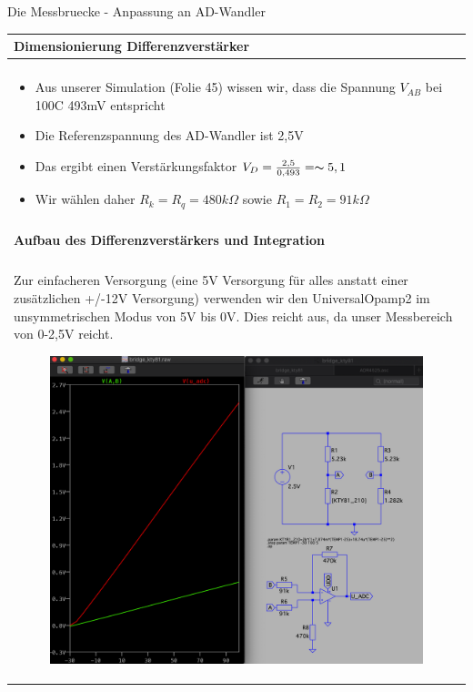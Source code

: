 \begin{frame}[t]{Die Messbruecke - Anpassung an AD-Wandler} 
    
    \begin{spacing}{0.9} \begin{tiny}
      \begin{table}[h!]
      \begin{tabular}{p{10cm} }
        \hline
        \textbf{Dimensionierung Differenzverstärker} \\
        \hline \\
        \begin{minipage}{\textwidth}
           \begin{itemize}
               \item Aus unserer Simulation (Folie 45) wissen wir, dass die Spannung $V_{AB}$ bei 100C 493mV entspricht
               \item Die Referenzspannung des AD-Wandler ist 2,5V 
               \item Das ergibt einen Verstärkungsfaktor $V_D=\frac{2,5}{0,493}=\thicksim 5,1$
               \item Wir wählen daher $R_k=R_q=480k\Omega$ sowie $R_1=R_2=91k\Omega$ 
           \end{itemize}
        \end{minipage} 
        \\\\
        \hline
        \textbf{Aufbau des Differenzverstärkers und Integration} \\
        \hline \\
        \begin{minipage}{\textwidth}
            Zur einfacheren Versorgung (eine 5V Versorgung für alles anstatt einer zusätzlichen +/-12V Versorgung)
            verwenden wir den UniversalOpamp2 im unsymmetrischen Modus von 5V bis 0V. Dies reicht aus, da unser Messbereich
            von 0-2,5V reicht.
            \begin{figure}
                \centering
                \includegraphics[width=0.5\linewidth]{pictures/diff_ampl_uadc_1.png}
            \end{figure}
        \end{minipage} 
    \end{tabular}

    \end{table}
     
    \end{tiny} \end{spacing}

\end{frame}

